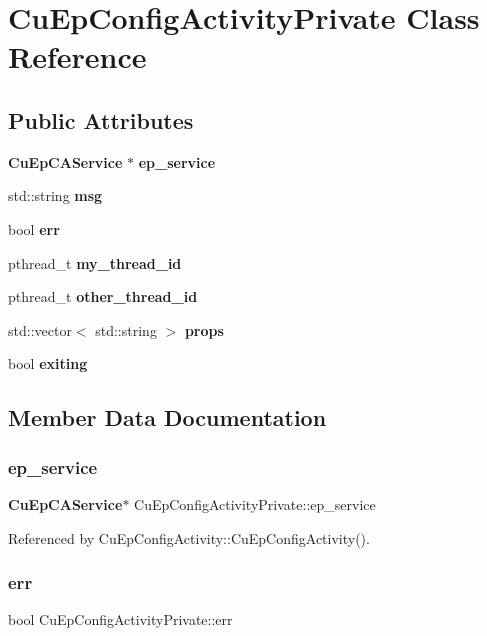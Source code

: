 \section{Cu\+Ep\+Config\+Activity\+Private Class Reference}
\label{classCuEpConfigActivityPrivate}
\subsection*{Public Attributes}
\begin{DoxyCompactItemize}
\item 
\textbf{ Cu\+Ep\+C\+A\+Service} $\ast$ \textbf{ ep\+\_\+service}
\item 
std\+::string \textbf{ msg}
\item 
bool \textbf{ err}
\item 
pthread\+\_\+t \textbf{ my\+\_\+thread\+\_\+id}
\item 
pthread\+\_\+t \textbf{ other\+\_\+thread\+\_\+id}
\item 
std\+::vector$<$ std\+::string $>$ \textbf{ props}
\item 
bool \textbf{ exiting}
\end{DoxyCompactItemize}


\subsection{Member Data Documentation}
\mbox{\label{classCuEpConfigActivityPrivate_a04bb0b3ccf954c6664bab6469545017d}} 
\subsubsection{ep\+\_\+service}
{\footnotesize\ttfamily \textbf{ Cu\+Ep\+C\+A\+Service}$\ast$ Cu\+Ep\+Config\+Activity\+Private\+::ep\+\_\+service}



Referenced by Cu\+Ep\+Config\+Activity\+::\+Cu\+Ep\+Config\+Activity().

\mbox{\label{classCuEpConfigActivityPrivate_ab85123ed5399f3459ddcc6acf9563588}} 
\subsubsection{err}
{\footnotesize\ttfamily bool Cu\+Ep\+Config\+Activity\+Private\+::err}



